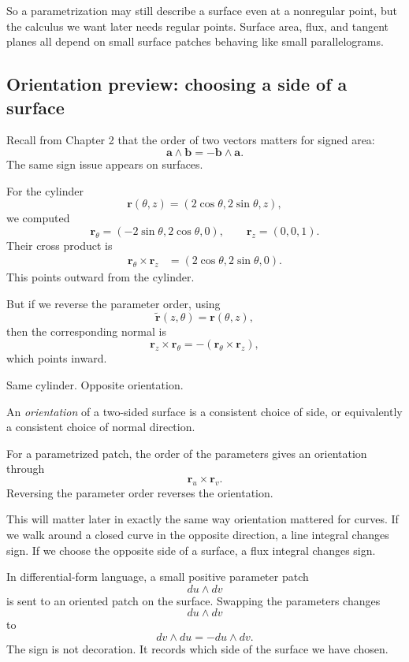 So a parametrization may still describe a surface even at a nonregular point, but the
calculus we want later needs regular points.  Surface area, flux, and tangent planes all
depend on small surface patches behaving like small parallelograms.

\subsection{Orientation preview: choosing a side of a surface}

Recall from Chapter 2 that the order of two vectors matters for signed area:
\[
    \mathbf a\wedge\mathbf b=-\mathbf b\wedge\mathbf a.
\]
The same sign issue appears on surfaces.

For the cylinder
\[
    \mathbf r(\theta,z)=(2\cos\theta,2\sin\theta,z),
\]
we computed
\[
    \mathbf r_\theta=(-2\sin\theta,2\cos\theta,0),
    \qquad
    \mathbf r_z=(0,0,1).
\]
Their cross product is
\[
\begin{aligned}
    \mathbf r_\theta\times \mathbf r_z
    &=
    (2\cos\theta,2\sin\theta,0).
\end{aligned}
\]
This points outward from the cylinder.

But if we reverse the parameter order, using
\[
    \widetilde{\mathbf r}(z,\theta)=\mathbf r(\theta,z),
\]
then the corresponding normal is
\[
    \mathbf r_z\times\mathbf r_\theta
    =
    -(\mathbf r_\theta\times\mathbf r_z),
\]
which points inward.

Same cylinder.  Opposite orientation.

\begin{definition}
An \emph{orientation} of a two-sided surface is a consistent choice of side, or
equivalently a consistent choice of normal direction.

For a parametrized patch, the order of the parameters gives an orientation through
\[
    \mathbf r_u\times\mathbf r_v.
\]
Reversing the parameter order reverses the orientation.
\end{definition}

This will matter later in exactly the same way orientation mattered for curves.  If we
walk around a closed curve in the opposite direction, a line integral changes sign.  If we
choose the opposite side of a surface, a flux integral changes sign.

In differential-form language, a small positive parameter patch
\[
    du\wedge dv
\]
is sent to an oriented patch on the surface.  Swapping the parameters changes
\[
    du\wedge dv
\]
to
\[
    dv\wedge du=-du\wedge dv.
\]
The sign is not decoration.  It records which side of the surface we have chosen.

